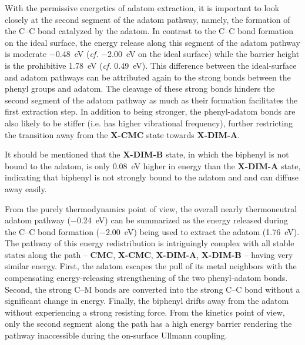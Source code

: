 \documentclass[%
 reprint,
 amsmath,amssymb,
 aps,
prb,
floatfix,
]{revtex4-2}
\begin{document}
{With the permissive energetics of adatom extraction, it is important to look closely at the second segment of the adatom pathway, namely, the formation of the C--C bond catalyzed by the adatom. 
In contrast to the C--C bond formation on the ideal surface, the energy release along this segment of the adatom pathway is moderate \SI{-0.48}{\electronvolt} (\textit{cf.} \SI{-2.00}{\electronvolt} on the ideal surface) while the barrier height is the prohibitive \SI{1.78}{\electronvolt} (\textit{cf.} \SI{0.49}{\electronvolt}). 
This difference between the ideal-surface and adatom pathways can be attributed again to the strong bonds between the phenyl groups and adatom.
The cleavage of these strong bonds hinders the second segment of the adatom pathway as much as their formation facilitates the first extraction step. In addition to being stronger, the phenyl-adatom bonds are also likely to be stiffer (i.e. has higher vibrational frequency), further restricting the transition away from the \textbf{X-CMC} state towards \textbf{X-DIM-A}. 

It should be mentioned that the \textbf{X-DIM-B} state, in which the biphenyl is not bound to the adatom, is only \SI{0.08}{\electronvolt} higher in energy than the \textbf{X-DIM-A} state, indicating that biphenyl is not strongly bound to the adatom and and can diffuse away easily. 

From the purely thermodynamics point of view, the overall nearly thermoneutral adatom pathway (\SI{-0.24}{\electronvolt}) can be summarized as the energy released during the C--C bond formation (\SI{-2.00}{\electronvolt}) being used to extract the adatom (\SI{1.76}{\electronvolt}). The pathway of this energy redistribution is intriguingly complex with all stable states along the path -- \textbf{CMC}, \textbf{X-CMC}, \textbf{X-DIM-A}, \textbf{X-DIM-B} -- having very similar energy. First, the adatom escapes the pull of its metal neighbors with the compensating energy-releasing strengthening of the two phenyl-adatom bonds. Second, the strong C--M bonds are converted into the strong C--C bond without a significant change in energy. Finally, the biphenyl drifts away from the adatom without experiencing a strong resisting force. From the kinetics point of view, only the second segment along the path has a high energy barrier rendering the pathway inaccessible during the on-surface Ullmann coupling.


}
\end{document}
